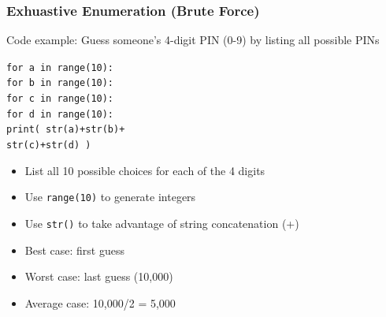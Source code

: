 \documentclass{beamer}
\newcommand{\code}[1]{\texttt{#1}}
\newcommand{\tab}{\hspace*{22pt}}
\begin{document}
\begin{frame}	
	\frametitle{Exhuastive Enumeration (Brute Force)}
	
	\begin{block}{Code example:}
			Guess someone's 4-digit PIN (0-9) by listing all possible PINs
			
			\vspace{10pt}
			
			\begin{scriptsize}
			\code{for a in range(10): \\[-5pt]
			\tab for b in range(10): \\[-5pt]
			\tab \tab for c in range(10): \\[-5pt]
			\tab \tab \tab for d in range(10): \\[-5pt]
			\tab \tab \tab \tab print( str(a)+str(b)+ \\[-5pt]
			\tab \tab \tab \tab \tab str(c)+str(d) )
			}
			\end{scriptsize}
		\endminipage\hfill
			\begin{itemize}
				\item List all 10 possible choices for each of the 4 digits
				\item Use \code{range(10)} to generate integers
				\item Use \code{str()} to take advantage of string concatenation (+)
				\item Best case: first guess
				\item Worst case: last guess (10,000)
				\item Average case: 10,000/2 = 5,000
			\end{itemize}
		\endminipage\hfill
	\end{block}
	
\end{frame}
\end{document}

